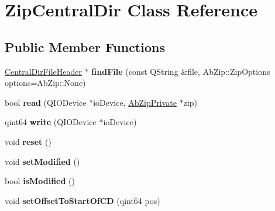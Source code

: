 \hypertarget{class_zip_central_dir}{}\section{Zip\+Central\+Dir Class Reference}
\label{class_zip_central_dir}
\subsection*{Public Member Functions}
\begin{DoxyCompactItemize}
\item 
\hyperlink{class_central_dir_file_header}{Central\+Dir\+File\+Header} $\ast$ {\bfseries find\+File} (const Q\+String \&file, Ab\+Zip\+::\+Zip\+Options options=Ab\+Zip\+::\+None)\hypertarget{class_zip_central_dir_a9e3d196b1b30e4b84999bb765bb4443c}{}\label{class_zip_central_dir_a9e3d196b1b30e4b84999bb765bb4443c}

\item 
bool {\bfseries read} (Q\+I\+O\+Device $\ast$io\+Device, \hyperlink{class_ab_zip_private}{Ab\+Zip\+Private} $\ast$zip)\hypertarget{class_zip_central_dir_aca04f8c6d0353584c834e1b2a3fe0492}{}\label{class_zip_central_dir_aca04f8c6d0353584c834e1b2a3fe0492}

\item 
qint64 {\bfseries write} (Q\+I\+O\+Device $\ast$io\+Device)\hypertarget{class_zip_central_dir_ac319fbf93540ef44ba309463538ab8a1}{}\label{class_zip_central_dir_ac319fbf93540ef44ba309463538ab8a1}

\item 
void {\bfseries reset} ()\hypertarget{class_zip_central_dir_a90000923d889c64ea60ca97a32c64bde}{}\label{class_zip_central_dir_a90000923d889c64ea60ca97a32c64bde}

\item 
void {\bfseries set\+Modified} ()\hypertarget{class_zip_central_dir_a04663567e505f98a16f15051f1cf5aef}{}\label{class_zip_central_dir_a04663567e505f98a16f15051f1cf5aef}

\item 
bool {\bfseries is\+Modified} ()\hypertarget{class_zip_central_dir_a4d2a572fa388c457664c42b3db2c8ed5}{}\label{class_zip_central_dir_a4d2a572fa388c457664c42b3db2c8ed5}

\item 
void {\bfseries set\+Offset\+To\+Start\+Of\+CD} (qint64 pos)\hypertarget{class_zip_central_dir_aa38e1915249b5efc081607a789f99389}{}\label{class_zip_central_dir_aa38e1915249b5efc081607a789f99389}


\end{DoxyCompactItemize}
